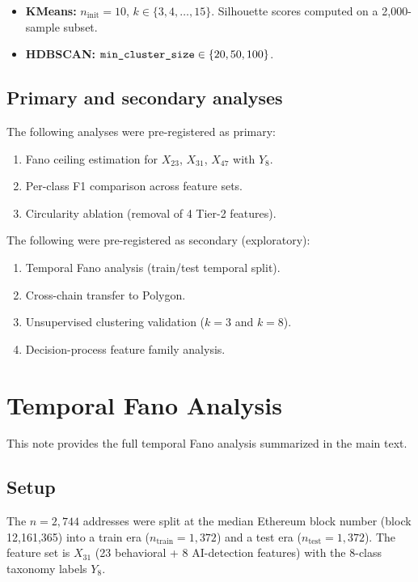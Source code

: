 \documentclass[11pt,a4paper]{article}
\renewcommand{\_}{\oldunderscore\allowbreak}
\begin{document}
\begin{itemize}
  \item \textbf{KMeans:} $n_{\text{init}} = 10$, $k \in \{3, 4, \ldots, 15\}$.
        Silhouette scores computed on a 2{,}000-sample subset.
  \item \textbf{HDBSCAN:} $\texttt{min\_cluster\_size} \in \{20, 50, 100\}$.
\end{itemize}

\subsection{Primary and secondary analyses}

The following analyses were pre-registered as primary:
\begin{enumerate}
  \item Fano ceiling estimation for $X_{23}$, $X_{31}$, $X_{47}$ with $Y_8$.
  \item Per-class F1 comparison across feature sets.
  \item Circularity ablation (removal of 4 Tier-2 features).
\end{enumerate}

The following were pre-registered as secondary (exploratory):
\begin{enumerate}
  \item Temporal Fano analysis (train/test temporal split).
  \item Cross-chain transfer to Polygon.
  \item Unsupervised clustering validation ($k = 3$ and $k = 8$).
  \item Decision-process feature family analysis.
\end{enumerate}

\section{Temporal Fano Analysis}
\label{sec:note4}

This note provides the full temporal Fano analysis summarized in the
main text.

\subsection{Setup}

The $n = 2{,}744$ addresses were split at the median Ethereum block
number (block 12{,}161{,}365) into a train era ($n_{\text{train}} = 1{,}372$)
and a test era ($n_{\text{test}} = 1{,}372$). The feature set is $X_{31}$
(23 behavioral + 8 AI-detection features) with the 8-class taxonomy
labels $Y_8$.
\end{document}
